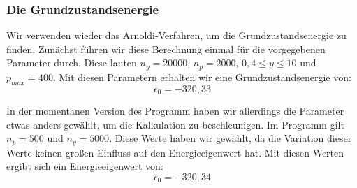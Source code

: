 \documentclass[11pt,a4paper]{article}
\begin{document}
\subsubsection*{Die Grundzustandsenergie}

Wir verwenden wieder das Arnoldi-Verfahren, um die Grundzustandsenergie zu finden. 
Zunächst führen wir diese Berechnung einmal für die vorgegebenen Parameter durch. Diese lauten $n_y = 20000$, $n_p=2000$, $0,4\leq y \leq 10$ und $p_{max} = 400$. Mit diesen Parametern erhalten wir eine Grundzustandsenergie von:
\begin{equation}
	\epsilon_0 = -320,33
\end{equation}

In der momentanen Version des Programm haben wir allerdings die Parameter etwas anders gewählt, um die Kalkulation zu beschleunigen. Im Programm gilt $n_p=500$ und $n_y = 5000$. Diese Werte haben wir gewählt, da die Variation dieser Werte keinen großen Einfluss auf den Energieeigenwert hat. Mit diesen Werten ergibt sich ein Energieeigenwert von:
\begin{equation*}
	\epsilon_0 = -320,34
\end{equation*}
\end{document}
